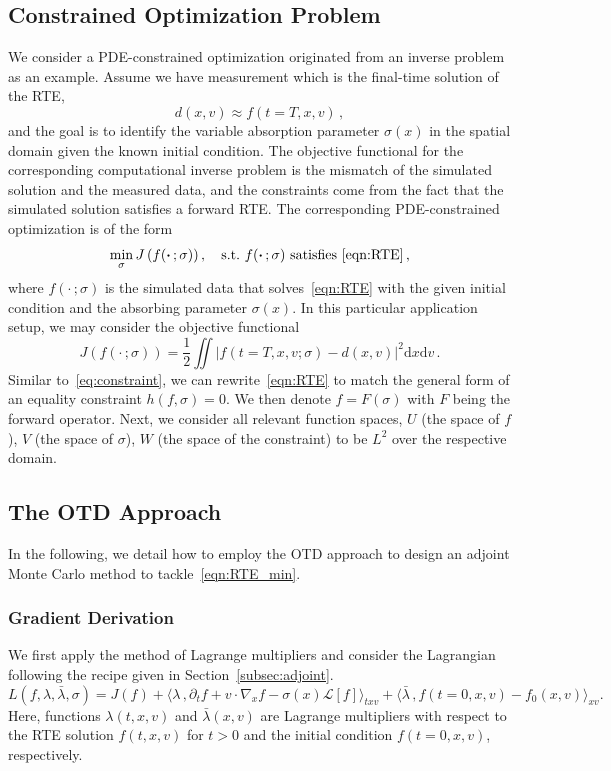 \documentclass[12pt]{amsart}
\newcommand{\rd}{\mathrm{d}}
\begin{document}
\subsection{Constrained Optimization Problem}
We consider a PDE-constrained optimization originated from an inverse problem as an example. Assume we have measurement which is the final-time solution of the RTE,
\[
d(x,v) \approx f(t=T,x,v)\,,
\] 
and the goal is to identify the variable absorption parameter $\sigma(x)$ in the spatial domain given the known initial condition. 
The objective functional for the corresponding computational inverse problem is the mismatch of the simulated solution and the measured data, and the constraints come from the fact that the simulated solution  satisfies a forward RTE. The corresponding PDE-constrained optimization is of the form
\begin{equation}\label{eqn:RTE_min}
\min_\sigma J\left(f(\boldsymbol{\cdot}\, ; \sigma)\right), \quad \text{s.t.} \text{~$f(\boldsymbol{\cdot}\, ; \sigma)$ satisfies~\eqref{eqn:RTE}\,,} 
\end{equation}
where $f(\boldsymbol{\cdot}\,;\sigma)$ is the simulated data that solves~\eqref{eqn:RTE} with the given initial condition and the absorbing parameter $\sigma(x)$.
In this particular application setup, we may consider the objective functional
\[
J\left(f(\boldsymbol{\cdot}\, ; \sigma)\right)=\frac{1}{2}\iint  
 | f(t=T,x,v;\sigma) - d(x,v) |^2\rd x \rd v\,.
\]
Similar to~\eqref{eq:constraint}, we can rewrite~\eqref{eqn:RTE} to match the general form of an equality constraint $h(f,\sigma) = 0$. We then denote $f = F(\sigma)$ with $F$ being the forward operator. Next, we consider all relevant function spaces, $U$ (the space of $f$), $V$ (the space of $\sigma$), $W$ (the space of the constraint) to be $L^2$ over the respective domain.

\subsection{The OTD Approach}
In the following, we detail how to employ the OTD approach to  design an adjoint Monte Carlo method to tackle~\eqref{eqn:RTE_min}.
\subsubsection{Gradient Derivation}
We first apply the method of Lagrange multipliers and consider the Lagrangian following the recipe given in Section~\ref{subsec:adjoint}.
\[
L(f,\lambda, \bar{\lambda}, \sigma) = J(f) + \langle \lambda \,,\partial_t f +v\cdot\nabla_x f -  \sigma(x)\mathcal{L}[f]\rangle_{txv} + \langle \bar{\lambda}\,,f(t=0,x,v) - f_0(x,v)\rangle_{xv}.
\]
Here, functions $\lambda(t,x,v)$ and $\bar{\lambda}(x,v)$ are Lagrange multipliers with respect to the RTE solution $f(t,x,v)$ for $t>0$ and the initial condition $f(t=0,x,v)$, respectively. 
\end{document}
